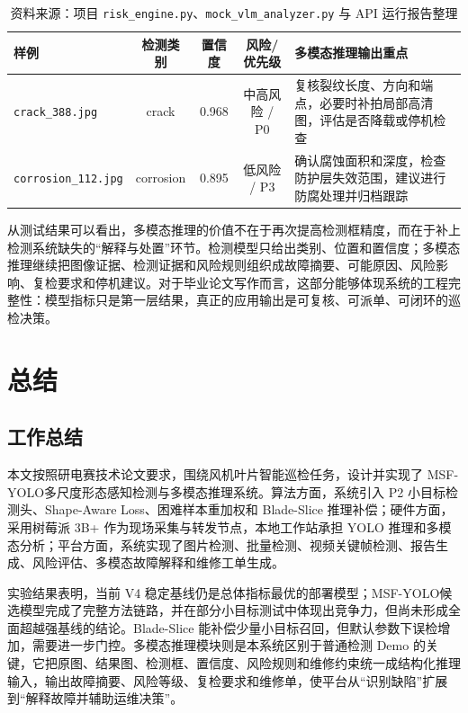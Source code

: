 \documentclass[UTF8,zihao=-4,a4paper]{ctexrep}
\newcommand{\method}{MSF-YOLO}
\newcommand{\code}[1]{\texttt{#1}}
\newcommand{\tablesource}[1]{\vspace{-0.4em}\caption*{\footnotesize 资料来源：#1}}
\begin{document}
\begin{table}[H]
  \centering
  \caption{平台样例的多模态推理结果}
  \label{tab:mm_case}
  \small
  \begin{tabularx}{\textwidth}{l c c c X}
    \toprule
    样例 & 检测类别 & 置信度 & 风险/优先级 & 多模态推理输出重点 \\
    \midrule
    \code{crack\_388.jpg} & crack & 0.968 & 中高风险 / P0 & 复核裂纹长度、方向和端点，必要时补拍局部高清图，评估是否降载或停机检查 \\
    \code{corrosion\_112.jpg} & corrosion & 0.895 & 低风险 / P3 & 确认腐蚀面积和深度，检查防护层失效范围，建议进行防腐处理并归档跟踪 \\
    \bottomrule
  \end{tabularx}
  \tablesource{项目 \code{risk\_engine.py}、\code{mock\_vlm\_analyzer.py} 与 API 运行报告整理}
\end{table}

从测试结果可以看出，多模态推理的价值不在于再次提高检测框精度，而在于补上检测系统缺失的“解释与处置”环节。检测模型只给出类别、位置和置信度；多模态推理继续把图像证据、检测证据和风险规则组织成故障摘要、可能原因、风险影响、复检要求和停机建议。对于毕业论文写作而言，这部分能够体现系统的工程完整性：模型指标只是第一层结果，真正的应用输出是可复核、可派单、可闭环的巡检决策。

\chapter{总结}

\section{工作总结}
本文按照研电赛技术论文要求，围绕风机叶片智能巡检任务，设计并实现了 \method 多尺度形态感知检测与多模态推理系统。算法方面，系统引入 P2 小目标检测头、Shape-Aware Loss、困难样本重加权和 Blade-Slice 推理补偿；硬件方面，采用树莓派 3B+ 作为现场采集与转发节点，本地工作站承担 YOLO 推理和多模态分析；平台方面，系统实现了图片检测、批量检测、视频关键帧检测、报告生成、风险评估、多模态故障解释和维修工单生成。

实验结果表明，当前 V4 稳定基线仍是总体指标最优的部署模型；\method 候选模型完成了完整方法链路，并在部分小目标测试中体现出竞争力，但尚未形成全面超越强基线的结论。Blade-Slice 能补偿少量小目标召回，但默认参数下误检增加，需要进一步门控。多模态推理模块则是本系统区别于普通检测 Demo 的关键，它把原图、结果图、检测框、置信度、风险规则和维修约束统一成结构化推理输入，输出故障摘要、风险等级、复检要求和维修单，使平台从“识别缺陷”扩展到“解释故障并辅助运维决策”。
\end{document}
